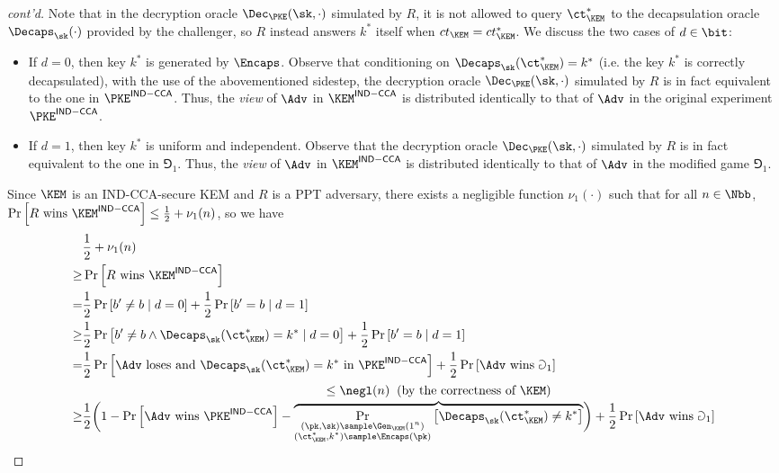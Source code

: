 \begin{answer}
\begin{proof}[cont'd]
        Note that in the decryption oracle $\Dec_\PKE(\sk, \cdot)$ simulated by $R$, it is not allowed to query $\ct_\KEM^\ast$ to the decapsulation oracle $\Decaps_\sk(\cdot)$ provided by the challenger, so $R$ instead answers $k^\ast$ itself when $ct_\KEM = ct_\KEM^\ast$. We discuss the two cases of $d\in\bit$:
        \begin{itemize}
            \item If $d=0$, then key $k^\ast$ is generated by $\Encaps$. Observe that conditioning on $ \Decaps_\sk( \ct_\KEM^\ast)=k^\ast$ (i.e. the key $k^\ast$ is correctly decapsulated), with the use of the abovementioned sidestep, the decryption oracle $\Dec_\PKE(\sk, \cdot)$ simulated by $R$ is in fact equivalent to the one in $\PKE^{\mathsf{IND-CCA}}$. 
            Thus, the \textit{view} of $\Adv$ in $\KEM^{\mathsf{IND-CCA}}$ is distributed identically to that of $\Adv$ in the original experiment $\PKE^{\mathsf{IND-CCA}}$.
            \item If $d=1$, then key $k^\ast$ is uniform and independent. Observe that the decryption oracle $\Dec_\PKE(\sk, \cdot)$ simulated by $R$ is in fact equivalent to the one in  $\Game_1$. Thus, the \textit{view} of $\Adv$ in $\KEM^{\mathsf{IND-CCA}}$ is distributed identically to that of $\Adv$ in the modified game $\Game_1$.
        \end{itemize}
        Since $\KEM$ is an IND-CCA-secure KEM and $R$ is a PPT adversary, there exists a negligible function $\nu_1(\cdot)$ such that for all $n\in\Nbb$, $ \Pr\left[R \textrm{ wins } \KEM^{\mathsf{IND-CCA}} \right] \le \frac{1}{2}+\nu_1(n)$, so we have
        \begin{align*}
            &\frac{1}{2}+\nu_1(n)\\
            \ge&\Pr\left[R \textrm{ wins } \KEM^{\mathsf{IND-CCA}} \right]\\
            =&\frac{1}{2}\Pr\left[b'\neq b\mid d=0  \right]+\frac{1}{2}\Pr\left[b'= b  \mid d=1 \right]\\
            \ge&\frac{1}{2}\Pr\left[b'\neq b\land \Decaps_\sk( \ct_\KEM^\ast)=k^\ast \mid d=0  \right]+\frac{1}{2}\Pr\left[b'= b  \mid d=1 \right]\\
            =& \frac{1}{2}\Pr\left[\Adv \textrm{ loses and  } \Decaps_\sk( \ct_\KEM^\ast)=k^\ast \textrm{ in } \PKE^{\mathsf{IND-CCA}}  \right]+\frac{1}{2}\Pr\left[ \Adv \textrm{ wins }   \Game_1  \right]\\
            \ge& \frac{1}{2}\biggl(1- \Pr\left[\Adv \textrm{ wins }  \PKE^{\mathsf{IND-CCA}}\right] - \overbrace{\Pr_{\substack{(\pk, \sk)\sample\Gen_\KEM(1^n)\\(\ct_\KEM^\ast, k^\ast)\sample \Encaps(\pk)}}\left[\Decaps_\sk( \ct_\KEM^\ast)\neq k^\ast\right]}^{\begin{aligned}\le \negl(n) \;\; (\textrm{by the correctness of } \KEM)\end{aligned}}  \biggr)  +\frac{1}{2}\Pr\left[\Adv \textrm{ wins }  \Game_1\right]\\

\end{align*}
\end{proof}
\end{answer}
